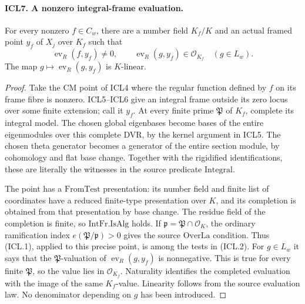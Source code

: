 \documentclass[11pt,a4paper]{article}
\numberwithin{equation}{section}
\theoremstyle{remark}\newtheorem{remark}[theorem]{Remark}
\begin{document}
\paragraph{ICL7. A nonzero integral-frame evaluation.}
\label{claim:ICL7}
For every nonzero \(f\in C_w\), there are a number field
\(K_f/K\) and an actual framed point \(y_f\) of \(X_j\) over
\(K_f\) such that
\[
 \operatorname{ev}_R(f,y_f)\ne0,\qquad
 \operatorname{ev}_R(g,y_f)\in\mathcal O_{K_f}\quad(g\in L_w).
                                                               \tag{ICL.4}
\]
The map \(g\mapsto\operatorname{ev}_R(g,y_f)\) is \(K\)-linear.
\begin{proof}
Take the CM point of ICL4 where the regular function defined
by \(f\) on its frame fibre is nonzero.  ICL5--ICL6 give an
integral frame outside its zero locus over some finite
extension; call it \(y_f\).  At every finite prime
\(\mathfrak P\) of \(K_f\), complete its integral model.
The chosen global eigenbases become bases of the entire
eigenmodules over this complete DVR, by the kernel argument
in ICL5.  The chosen theta generator becomes a generator of
the entire section module, by cohomology and flat base change.
Together with the rigidified identifications, these are
literally the witnesses in the source predicate
\(\mathrm{Integral}\).

The point has a \(\mathrm{FromTest}\) presentation: its
number field and finite list of coordinates have a reduced
finite-type presentation over \(K\), and its completion is
obtained from that presentation by base change.  The residue
field of the completion is finite, so
\(\mathrm{IntFr.IsAlg}\) holds.  If
\(\mathfrak p=\mathfrak P\cap\mathcal O_K\), the ordinary
ramification index \(e(\mathfrak P/\mathfrak p)>0\) gives the
source \(\mathrm{OverLa}\) condition.  Thus (ICL.1), applied
to this precise point, is among the tests in (ICL.2).
For \(g\in L_w\) it says that the \(\mathfrak P\)-valuation
of \(\operatorname{ev}_R(g,y_f)\) is nonnegative.  This is
true for every finite \(\mathfrak P\), so the value lies in
\(\mathcal O_{K_f}\).  Naturality identifies the completed
evaluation with the image of the same \(K_f\)-value.
Linearity follows from the source evaluation law.  No
denominator depending on \(g\) has been introduced.
\end{proof}

\end{document}
